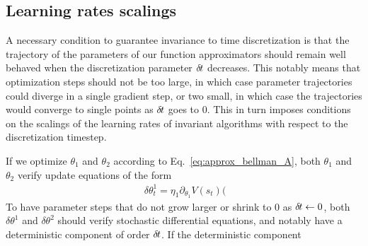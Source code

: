 \subsection{Learning rates scalings}
\label{subsec:lr}
A necessary condition to guarantee invariance to time discretization is that
the trajectory of the parameters of our function approximators should remain
well behaved when the discretization parameter $\delta\hspace{-.1em}t$ decreases. This notably
means that optimization steps should not be too large, in which case parameter
trajectories could diverge in a single gradient step, or two small, in which case
the trajectories would converge to single points as $\delta\hspace{-.1em}t$ goes to $0$.
This in turn imposes conditions on the scalings of the learning rates of invariant
algorithms with respect to the discretization timestep.

If we optimize $\theta_1$ and $\theta_2$ according to Eq.~\eqref{eq:approx_bellman_A},
both $\theta_1$ and $\theta_2$ verify update equations of the form
\begin{align}
	\
	\delta \theta^1_t = \eta_1 \partial_{\theta_1} V(s_t) (
\end{align}
To have parameter steps that do not grow larger or shrink to $0$ as $\delta\hspace{-.1em}t
\leftarrow 0$, both $\delta \theta^1$ and $\delta \theta^2$ should verify
stochastic differential equations, and notably have a deterministic component
of order $\delta\hspace{-.1em}t$. If the deterministic component 
